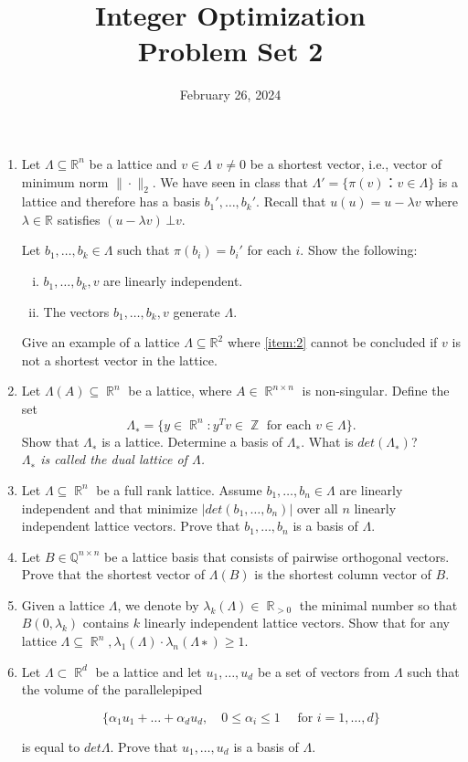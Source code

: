 \documentclass[11pt,a4paper]{article}
\title{Integer Optimization  \\ Problem Set 2 }
\date{ February 26, 2024}
\renewcommand{\leq}{\leqslant}
\renewcommand{\geq}{\geqslant}
\DeclareMathOperator{\RR}{\mathbb{R}}
\DeclareMathOperator{\ZZ}{\mathbb{Z}}
\begin{document}
\maketitle 




\begin{enumerate} 
\item

  Let $Λ ⊆ ℝ^n$ be a lattice and $v ∈ Λ$  $ v ≠0$ be a shortest vector, i.e., vector of minimum norm $\| ⋅ \|_2$. We have seen in class that $Λ' = \{π(v) ： v ∈ Λ\}$ is a lattice and therefore has a basis $b_1',\dots,b_k'$. Recall that $u(u) = u - λ v$ where $λ ∈ ℝ$ satisfies $(u - λ v ) \, ⊥ v$.

  Let $b_1,\dots,b_k ∈ Λ$ such that $π(b_i) = b_i'$ for each $i$. Show the following:

  \begin{enumerate}[i)] 
  \item $b_1,\dots,b_k,v$ are linearly independent. \label{item:1}
  \item The vectors $b_1,\dots,b_k,v$ generate $Λ$. \label{item:2}
  \end{enumerate}

Give an example of a lattice $Λ ⊆ ℝ^2$ where \ref{item:2} cannot be concluded if $v$ is not a shortest vector in the lattice. 


\item Let $Λ(A)⊆ \RR^n$ be a lattice, where $A∈\RR^{n×n}$ is non-singular. Define the set $$Λ_∗=\{y∈ \RR^n:y^Tv∈ \ZZ \text{ for each }v ∈ Λ\}.$$ Show that $Λ_∗$ is a lattice. Determine a basis of $Λ_∗$. What is $det(Λ_∗)$?\\
\textit{$Λ_∗$ is called the dual lattice of $Λ$.}

\item Let $Λ⊆\RR^n$ be a full rank lattice. Assume $b_1,\hdots,b_n ∈ Λ$ are linearly independent and that minimize $|det(b_1, \hdots ,b_n)|$
over all $n$ linearly independent lattice vectors. Prove that $b_1, \hdots ,b_n$ is a basis of $Λ$.

\item Let $B ∈ \mathbb{Q}^{n×n}$ be a lattice basis that consists of pairwise orthogonal vectors. Prove that the shortest vector
of $Λ(B )$ is the shortest column vector of $B$.

\item Given a lattice $Λ$, we denote by $λ_k(Λ) ∈ \RR_{>0}$ the minimal number so that $B(0,λ_k)$ contains $k$ linearly independent lattice vectors. Show that for any lattice $Λ ⊆ \RR^n , λ_1 (Λ) \cdot λ_n (Λ∗) \geq 1$.

\item Let $Λ ⊂ \RR^d$ be a lattice and let $u_1,\hdots,u_d$ be a set of vectors from $Λ$ such that the volume of the parallelepiped

$$\{α_1u_1 +\hdots+α_du_d, \quad 0\leq α_i\leq1 \quad \text{ for } i=1,\hdots,d\}$$

 is equal to $detΛ$. Prove that $u_1,\hdots ,u_d$ is a basis of $Λ$.
 

  

\end{enumerate}



%
%


 
\end{document}
